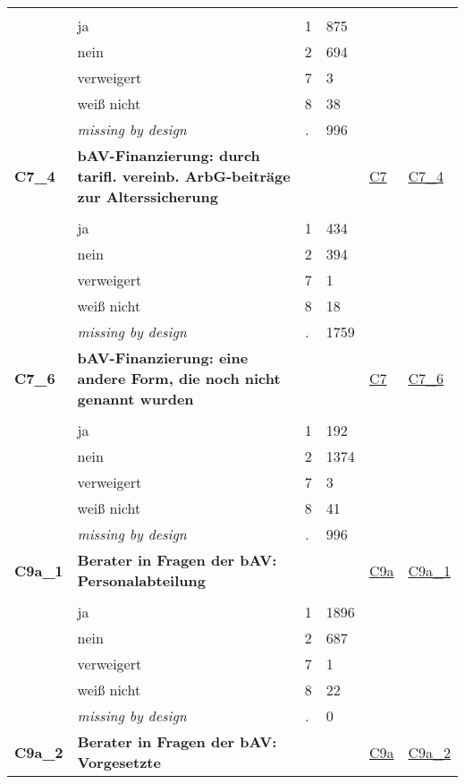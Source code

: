 \begin{longtable}{| L{2.45cm} | L{6cm} | C{1.5cm} | R{1cm} | C{2.25cm} | C{2.25cm} |}
   &  &  &  &  &  \\ 
   & ja & 1 & 875 &  &  \\ 
   & nein & 2 & 694 &  &  \\ 
   & verweigert & 7 & 3 &  &  \\ 
   & weiß nicht & 8 & 38 &  &  \\ 
   & \textit{missing by design} & \textit{.} & 996 &  &  \\ 
   \midrule
\textbf{C7\_4}\label{var:C7:4} & \textbf{bAV-Finanzierung: durch tarifl. vereinb. ArbG-beiträge zur Alterssicherung} &  &  & \hyperref[C7]{C7} & \hyperref[var:suf:C7:4]{C7\_4} \\ 
   &  &  &  &  &  \\ 
   & ja & 1 & 434 &  &  \\ 
   & nein & 2 & 394 &  &  \\ 
   & verweigert & 7 & 1 &  &  \\ 
   & weiß nicht & 8 & 18 &  &  \\ 
   & \textit{missing by design} & \textit{.} & 1759 &  &  \\ 
   \midrule
\textbf{C7\_6}\label{var:C7:6} & \textbf{bAV-Finanzierung: eine andere Form, die noch nicht genannt wurden} &  &  & \hyperref[C7]{C7} & \hyperref[var:suf:C7:6]{C7\_6} \\ 
   &  &  &  &  &  \\ 
   & ja & 1 & 192 &  &  \\ 
   & nein & 2 & 1374 &  &  \\ 
   & verweigert & 7 & 3 &  &  \\ 
   & weiß nicht & 8 & 41 &  &  \\ 
   & \textit{missing by design} & \textit{.} & 996 &  &  \\ 
   \midrule
\textbf{C9a\_1}\label{var:C9a:1} & \textbf{Berater in Fragen der bAV: Personalabteilung} &  &  & \hyperref[C9a]{C9a} & \hyperref[var:suf:C9a:1]{C9a\_1} \\ 
   &  &  &  &  &  \\ 
   & ja & 1 & 1896 &  &  \\ 
   & nein & 2 & 687 &  &  \\ 
   & verweigert & 7 & 1 &  &  \\ 
   & weiß nicht & 8 & 22 &  &  \\ 
   & \textit{missing by design} & \textit{.} & 0 &  &  \\ 
   \midrule
\textbf{C9a\_2}\label{var:C9a:2} & \textbf{ Berater in Fragen der bAV: Vorgesetzte} &  &  & \hyperref[C9a]{C9a} & \hyperref[var:suf:C9a:2]{C9a\_2} \\ 

\end{longtable}
